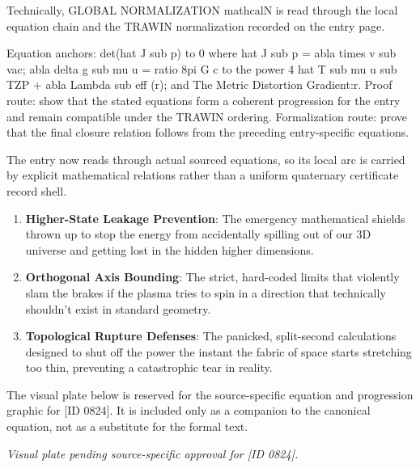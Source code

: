Technically, GLOBAL NORMALIZATION mathcalN is read through the local equation chain and the TRAWIN normalization recorded on the entry page.

Equation anchors: det(hat J sub p) to 0 where hat J sub p = abla times v sub vac; abla delta g sub mu u = ratio 8pi G c to the power 4 hat T sub mu u sub TZP + abla Lambda sub eff (r); and The Metric Distortion Gradient:r. Proof route: show that the stated equations form a coherent progression for the entry and remain compatible under the TRAWIN ordering. Formalization route: prove that the final closure relation follows from the preceding entry-specific equations.

The entry now reads through actual sourced equations, so its local arc is carried by explicit mathematical relations rather than a uniform quaternary certificate record shell.
\endgroup

\begin{enumerate}[leftmargin=1.6em,itemsep=6pt,topsep=4pt]
\item \textbf{Higher-State Leakage Prevention}: The emergency mathematical shields thrown up to stop the energy from accidentally spilling out of our 3D universe and getting lost in the hidden higher dimensions.
\item \textbf{Orthogonal Axis Bounding}: The strict, hard-coded limits that violently slam the brakes if the plasma tries to spin in a direction that technically shouldn't exist in standard geometry.
\item \textbf{Topological Rupture Defenses}: The panicked, split-second calculations designed to shut off the power the instant the fabric of space starts stretching too thin, preventing a catastrophic tear in reality.
\end{enumerate}

\begingroup\footnotesize\sloppy
The visual plate below is reserved for the source-specific equation and progression graphic for [ID 0824]. It is included only as a companion to the canonical equation, not as a substitute for the formal text.
\par\endgroup
\begingroup\footnotesize\itshape
Visual plate pending source-specific approval for [ID 0824].
\par\endgroup

